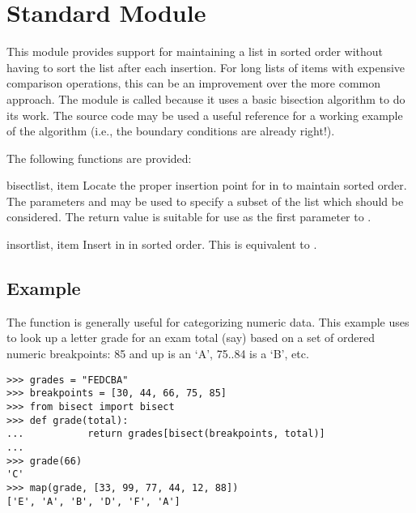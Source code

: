 
\section{Standard Module }
\label{module-bisect}


This module provides support for maintaining a list in sorted order
without having to sort the list after each insertion.  For long lists
of items with expensive comparison operations, this can be an
improvement over the more common approach.  The module is called
 because it uses a basic bisection algorithm to do its
work.  The source code may be used a useful reference for a working
example of the algorithm (i.e., the boundary conditions are already
right!).

The following functions are provided:

\begin{funcdesc}{bisect}{list, item}
Locate the proper insertion point for  in  to
maintain sorted order.  The parameters  and  may be
used to specify a subset of the list which should be considered.  The
return value is suitable for use as the first parameter to
.
\end{funcdesc}

\begin{funcdesc}{insort}{list, item}
Insert  in  in sorted order.  This is equivalent
to .
\end{funcdesc}


\subsection{Example}

The  function is generally useful for categorizing
numeric data.  This example uses  to look up a
letter grade for an exam total (say) based on a set of ordered numeric
breakpoints: 85 and up is an `A', 75..84 is a `B', etc.

\begin{verbatim}
>>> grades = "FEDCBA"
>>> breakpoints = [30, 44, 66, 75, 85]
>>> from bisect import bisect
>>> def grade(total):
...           return grades[bisect(breakpoints, total)]
...
>>> grade(66)
'C'
>>> map(grade, [33, 99, 77, 44, 12, 88])
['E', 'A', 'B', 'D', 'F', 'A']
\end{verbatim}
